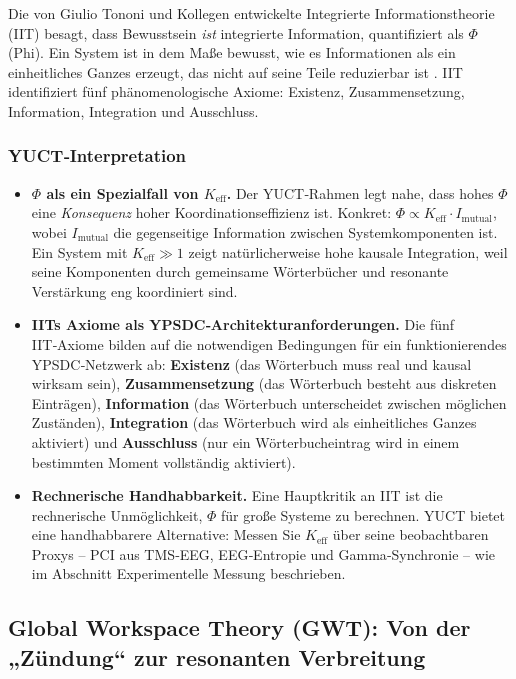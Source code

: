 \documentclass[12pt,a4paper]{article}
\begin{document}
	Die von Giulio Tononi und Kollegen entwickelte Integrierte Informationstheorie (IIT) besagt, dass Bewusstsein \textit{ist} integrierte Information, quantifiziert als \(\Phi\) (Phi). Ein System ist in dem Maße bewusst, wie es Informationen als ein einheitliches Ganzes erzeugt, das nicht auf seine Teile reduzierbar ist \cite{Tononi2008}. IIT identifiziert fünf phänomenologische Axiome: Existenz, Zusammensetzung, Information, Integration und Ausschluss.
	
	\subsubsection*{YUCT‑Interpretation}
	\begin{itemize}
		\item \textbf{\(\Phi\) als ein Spezialfall von \(K_{\mathrm{eff}}\).} Der YUCT‑Rahmen legt nahe, dass hohes \(\Phi\) eine \textit{Konsequenz} hoher Koordinationseffizienz ist. Konkret: \(\Phi \propto K_{\mathrm{eff}} \cdot I_{\text{mutual}}\), wobei \(I_{\text{mutual}}\) die gegenseitige Information zwischen Systemkomponenten ist. Ein System mit \(K_{\mathrm{eff}} \gg 1\) zeigt natürlicherweise hohe kausale Integration, weil seine Komponenten durch gemeinsame Wörterbücher und resonante Verstärkung eng koordiniert sind.
		\item \textbf{IITs Axiome als YPSDC‑Architekturanforderungen.} Die fünf IIT‑Axiome bilden auf die notwendigen Bedingungen für ein funktionierendes YPSDC‑Netzwerk ab: \textbf{Existenz} (das Wörterbuch muss real und kausal wirksam sein), \textbf{Zusammensetzung} (das Wörterbuch besteht aus diskreten Einträgen), \textbf{Information} (das Wörterbuch unterscheidet zwischen möglichen Zuständen), \textbf{Integration} (das Wörterbuch wird als einheitliches Ganzes aktiviert) und \textbf{Ausschluss} (nur ein Wörterbucheintrag wird in einem bestimmten Moment vollständig aktiviert).
		\item \textbf{Rechnerische Handhabbarkeit.} Eine Hauptkritik an IIT ist die rechnerische Unmöglichkeit, \(\Phi\) für große Systeme zu berechnen. YUCT bietet eine handhabbarere Alternative: Messen Sie \(K_{\mathrm{eff}}\) über seine beobachtbaren Proxys – PCI aus TMS‑EEG, EEG‑Entropie und Gamma‑Synchronie – wie im Abschnitt Experimentelle Messung beschrieben.
	\end{itemize}
	
	\subsection{Global Workspace Theory (GWT): Von der „Zündung“ zur resonanten Verbreitung}
	
\end{document}
